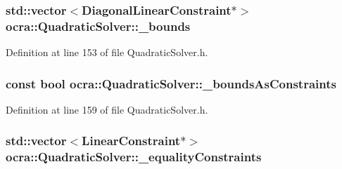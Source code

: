 \subsubsection[{\texorpdfstring{\+\_\+bounds}{_bounds}}]{\setlength{\rightskip}{0pt plus 5cm}std\+::vector$<${\bf Diagonal\+Linear\+Constraint}$\ast$$>$ ocra\+::\+Quadratic\+Solver\+::\+\_\+bounds\hspace{0.3cm}{\ttfamily [protected]}}\hypertarget{classocra_1_1QuadraticSolver_a5d2a0ca5a490f8c210780f281f0961e3}{}\label{classocra_1_1QuadraticSolver_a5d2a0ca5a490f8c210780f281f0961e3}


Definition at line 153 of file Quadratic\+Solver.\+h.

\subsubsection[{\texorpdfstring{\+\_\+bounds\+As\+Constraints}{_boundsAsConstraints}}]{\setlength{\rightskip}{0pt plus 5cm}const bool ocra\+::\+Quadratic\+Solver\+::\+\_\+bounds\+As\+Constraints\hspace{0.3cm}{\ttfamily [protected]}}\hypertarget{classocra_1_1QuadraticSolver_aad4e1bd8a751c4e827d5a637b1c2e9fb}{}\label{classocra_1_1QuadraticSolver_aad4e1bd8a751c4e827d5a637b1c2e9fb}


Definition at line 159 of file Quadratic\+Solver.\+h.

\subsubsection[{\texorpdfstring{\+\_\+equality\+Constraints}{_equalityConstraints}}]{\setlength{\rightskip}{0pt plus 5cm}std\+::vector$<${\bf Linear\+Constraint}$\ast$$>$ ocra\+::\+Quadratic\+Solver\+::\+\_\+equality\+Constraints\hspace{0.3cm}{\ttfamily [protected]}}\hypertarget{classocra_1_1QuadraticSolver_a0068a59d185c9556a0179dae5c5a2ff4}{}\label{classocra_1_1QuadraticSolver_a0068a59d185c9556a0179dae5c5a2ff4}


